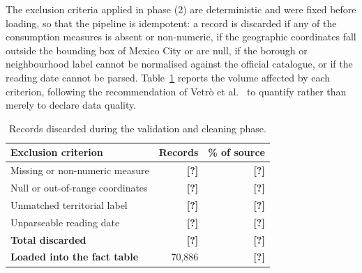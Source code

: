 \documentclass[runningheads]{llncs}
\renewcommand{\_}{\origunderscore\allowbreak}
\newif\ifshowchanges
\newcommand{\new}[1]{\ifshowchanges\textcolor{chg}{#1}\else#1\fi}
\newenvironment{chgblock}{\ifshowchanges\color{chg}\fi}{}
\newcommand{\fillin}[1]{\textcolor{todo}{\textbf{[#1]}}}
\begin{document}
\begin{chgblock}
The exclusion criteria applied in phase (2) are deterministic and were fixed
before loading, so that the pipeline is idempotent: a record is discarded if any
of the consumption measures is absent or non-numeric, if the geographic
coordinates fall outside the bounding box of Mexico City or are null, if the
borough or neighbourhood label cannot be normalised against the official
catalogue, or if the reading date cannot be parsed. Table~\ref{tab:cleaning}
reports the volume affected by each criterion, following the recommendation of
Vetr\`o et al.~\cite{vetro2016} to quantify rather than merely to declare data
quality.
\end{chgblock}

\begin{table}[tbp]
\centering
\caption{\new{Records discarded during the validation and cleaning phase.}}
\label{tab:cleaning}
{\ifshowchanges\color{chg}\fi
\begin{tabular}{@{}lrr@{}}
\toprule
\textbf{Exclusion criterion} & \textbf{Records} & \textbf{\% of source} \\
\midrule
Missing or non-numeric measure & \fillin{?} & \fillin{?} \\
Null or out-of-range coordinates           & \fillin{?} & \fillin{?} \\
Unmatched territorial label & \fillin{?} & \fillin{?} \\
Unparseable reading date                   & \fillin{?} & \fillin{?} \\
\midrule
\textbf{Total discarded}                   & \fillin{?} & \fillin{?} \\
\textbf{Loaded into the fact table}        & 70,886 & \fillin{?} \\
\bottomrule
\end{tabular}
}
\end{table}
\end{document}
